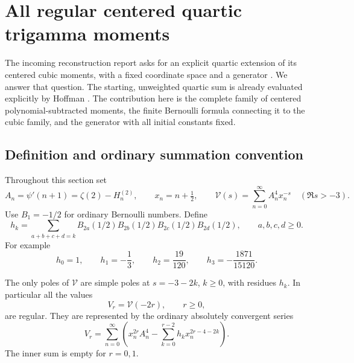 
\section{All regular centered quartic trigamma moments}
\label{qtm:section}

The incoming reconstruction report asks for an explicit quartic extension
of its centered cubic moments, with a fixed coordinate space and a
generator \cite[Question 5 and Section 6]{Reconstruction}.  We answer that
question.  The starting, unweighted quartic sum is already evaluated
explicitly by Hoffman \cite[Corollary 4.4 and the following example]{Hoffman}.
The contribution here is the complete family of centered
polynomial-subtracted moments, the finite Bernoulli formula connecting it
to the cubic family, and the generator with all initial constants fixed.

\subsection{Definition and ordinary summation convention}

Throughout this section set
\begin{equation}\label{qtm:definitions}
 A_n=\psi'(n+1)=\zeta(2)-H_n^{(2)},\qquad
 x_n=n+\tfrac12,\qquad
 \mathcal V(s)=\sum_{n=0}^{\infty}A_n^4x_n^{-s}
 \quad(\Re s>-3).
\end{equation}
Use $B_1=-1/2$ for ordinary Bernoulli numbers.  Define
\begin{equation}\label{qtm:h}
 h_k=\sum_{a+b+c+d=k}
 B_{2a}(1/2)B_{2b}(1/2)B_{2c}(1/2)B_{2d}(1/2),
 \qquad a,b,c,d\ge0.
\end{equation}
For example
\[
 h_0=1,\qquad h_1=-\frac13,\qquad h_2=\frac{19}{120},
 \qquad h_3=-\frac{1871}{15120}.
\]

\begin{proposition}
\label{qtm:regularity}
The only poles of $\mathcal V$ are simple poles at $s=-3-2k$,
$k\ge0$, with residues $h_k$.  In particular all the values
\begin{equation}\label{qtm:Vr}
 V_r=\mathcal V(-2r),\qquad r\ge0,
\end{equation}
are regular.  They are represented by the ordinary absolutely convergent
series
\begin{equation}\label{qtm:ordinary}
 \boxed{\displaystyle
 V_r=\sum_{n=0}^{\infty}\left(
 x_n^{2r}A_n^4-\sum_{k=0}^{r-2}h_kx_n^{2r-4-2k}\right).}
\end{equation}
The inner sum is empty for $r=0,1$.
\end{proposition}

